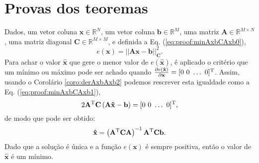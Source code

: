 \section{Provas dos teoremas}
 
\begin{myproofT}\label{proof:theo:minAxbCAxb}
Dados,
um vetor coluna $\mathbf{x}\in \mathbb{R}^N$, 
um vetor coluna $\mathbf{b}\in \mathbb{R}^M$,  
uma matriz $\mathbf{A} \in \mathbb{R}^{M\times N}$, 
uma matriz diagonal $\mathbf{C} \in \mathbb{R}^{M\times M}$, e 
definida a Eq. (\ref{eq:proof:minAxbCAxb0}),
\begin{equation}\label{eq:proof:minAxbCAxb0}
e(\mathbf{x})=||\mathbf{A}\mathbf{x}-\mathbf{b}||_{\mathbf{C}}^2.
\end{equation}
Para achar o valor  $\mathbf{\hat{x}}$ que gere o menor valor de $e(\mathbf{\hat{x}})$, é aplicado
o critério que um mínimo ou máximo pode ser achado quando 
$\frac{\partial e(\mathbf{\hat{x}})}{\partial \mathbf{x} }=[0~ 0~ \hdots~ 0 ]^{\mathrm{T}}$.
Assim, usando o Corolário \ref{coro:derAxbAxb2} podemos 
rescrever esta igualdade como a Eq. (\ref{eq:proof:minAxbCAxb1}),
\begin{equation}\label{eq:proof:minAxbCAxb1}
2 \mathbf{A}^{\mathrm{T}}\mathbf{C}\left(\mathbf{A}\mathbf{\hat{x}}-\mathbf{b}\right)=[0~ 0~ \hdots~ 0 ]^{\mathrm{T}},
\end{equation}
de modo que pode ser obtido:
\begin{equation}\label{eq:proof:minAxbCAxb2}
\mathbf{\hat{x}}=\left( \mathbf{A}^{\mathrm{T}}\mathbf{C}\mathbf{A} \right)^{-1} \mathbf{A}^{\mathrm{T}}\mathbf{C} \mathbf{b}.
\end{equation}
Dado que a solução é única e a função $e(\mathbf{x})$ é sempre positiva, então
o valor de $\mathbf{\hat{x}}$ é um mínimo.
\end{myproofT}

